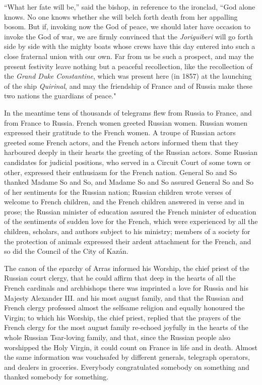 \documentclass{book}
\begin{document}
“What her fate will be,” said the bishop, in reference to the ironclad, “God alone knows. No one knows whether she will belch forth death from her appalling bosom. But if, invoking now the God of peace, we should later have occasion to invoke the God of war, we are firmly convinced that the \emph{Joriguiberi} will go forth side by side with the mighty boats whose crews have this day entered into such a close fraternal union with our own. Far from us be such a prospect, and may the present festivity leave nothing but a peaceful recollection, like the recollection of the \emph{Grand Duke Constantine}, which was present here (in 1857) at the launching of the ship \emph{Quirinal}, and may the friendship of France and of Russia make these two nations the guardians of peace."

In the meantime tens of thousands of telegrams flew from Russia to France, and from France to Russia. French women greeted Russian women. Russian women expressed their gratitude to the French women. A troupe of Russian actors greeted some French actors, and the French actors informed them that they harboured deeply in their hearts the greeting of the Russian actors. Some Russian candidates for judicial positions, who served in a Circuit Court of some town or other, expressed their enthusiasm for the French nation. General So and So thanked Madame So and So, and Madame So and So assured General So and So of her sentiments for the Russian nation; Russian children wrote verses of welcome to French children, and the French children answered in verse and in prose; the Russian minister of education assured the French minister of education of the sentiments of sudden love for the French, which were experienced by all the children, scholars, and authors subject to his ministry; members of a society for the protection of animals expressed their ardent attachment for the French, and so did the Council of the City of Kazán.

The canon of the eparchy of Arras informed his Worship, the chief priest of the Russian court clergy, that he could affirm that deep in the hearts of all the French cardinals and archbishops there was imprinted a love for Russia and his Majesty Alexander III. and his most august family, and that the Russian and French clergy professed almost the selfsame religion and equally honoured the Virgin; to which his Worship, the chief priest, replied that the prayers of the French clergy for the most august family re-echoed joyfully in the hearts of the whole Russian Tsar-loving family, and that, since the Russian people also worshipped the Holy Virgin, it could count on France in life and in death. Almost the same information was vouchsafed by different generals, telegraph operators, and dealers in groceries. Everybody congratulated somebody on something and thanked somebody for something.
\end{document}
